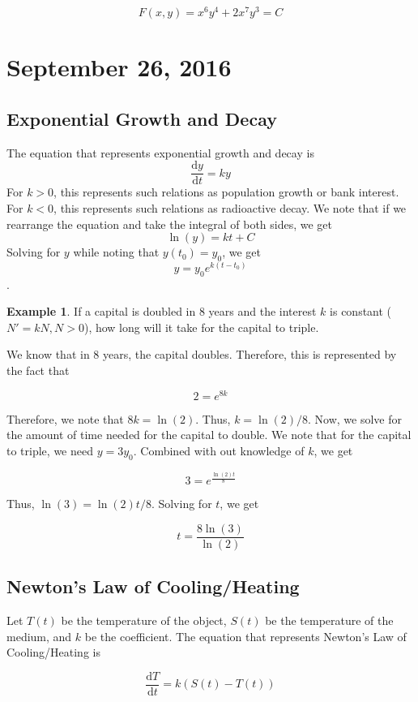 \documentclass[11pt]{article}
\theoremstyle{plain} %
\theoremstyle{definition}
\theoremstyle{example}
\newtheorem*{example}{Example}
\theoremstyle{remark}
\begin{document}
$$F(x,y) = x^6y^4+2x^7y^3 = C$$




\section{September 26, 2016}
\subsection{Exponential Growth and Decay}

The equation that represents exponential growth and decay is 
$$\frac{\mathrm d y}{\mathrm d t} = ky$$ For $k>0$, this represents such relations as population growth or bank interest. For $k < 0$, this represents such relations as radioactive decay. We note that if we rearrange the equation and take the integral of both sides, we get $$\ln(y) = kt + C$$ Solving for $y$ while noting that $y(t_0) =y_0$, we get 
$$y = y_0e^{k(t-t_0)}$$.




\begin{example}
If a capital is doubled in 8 years and the interest $k$ is constant ($N' = kN, N > 0$), how long will it take for the capital to triple. 
\end{example}

We know that in 8 years, the capital doubles. Therefore, this is represented by the fact that 

$$ 2 = e^{8k}$$

Therefore, we note that $8k = \ln(2)$. Thus, $k = \ln(2)/8$. Now, we solve for the amount of time needed for the capital to double. We note that for the capital to triple, we need $y = 3y_0$. Combined with out knowledge of $k$, we get

$$3 = e^{\frac{\ln(2)t}{8}}$$

Thus, $\ln(3) = \ln(2)t/8$. Solving for $t$, we get

$$t= \frac{8 \ln(3)}{\ln(2)}$$

\subsection{Newton's Law of Cooling/Heating}

Let $T(t)$ be the temperature of the object, $S(t)$ be the temperature of the medium, and $k$ be the coefficient. The equation that represents Newton's Law of Cooling/Heating is 

$$\frac{\mathrm d T}{\mathrm d t} = k(S(t) -T(t))$$
\end{document}
